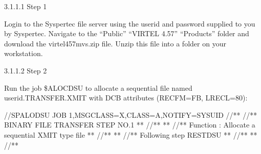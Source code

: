 \documentclass[letterpaper,10pt,english]{sphinxmanual}
\begin{document}
3.1.1.1 Step 1

Login to the Syspertec file server  using the userid and password supplied to you by Syspertec. Navigate to the “Public” \textendash{} “VIRTEL 4.57” \textendash{} “Products” folder and download the virtel457mvs.zip file. Unzip this file into a folder on your workstation.

3.1.1.2 Step 2

Run the job \$ALOCDSU to allocate a sequential file named userid.TRANSFER.XMIT with DCB attributes (RECFM=FB, LRECL=80):

\begin{sphinxVerbatim}[commandchars=\\\{\}]
//SPALODSU JOB 1,MSGCLASS=X,CLASS=A,NOTIFY=\PYGZam{}SYSUID
//*\PYGZhy{}\PYGZhy{}\PYGZhy{}\PYGZhy{}\PYGZhy{}\PYGZhy{}\PYGZhy{}\PYGZhy{}\PYGZhy{}\PYGZhy{}\PYGZhy{}\PYGZhy{}\PYGZhy{}\PYGZhy{}\PYGZhy{}\PYGZhy{}\PYGZhy{}\PYGZhy{}\PYGZhy{}\PYGZhy{}\PYGZhy{}\PYGZhy{}\PYGZhy{}\PYGZhy{}\PYGZhy{}\PYGZhy{}\PYGZhy{}\PYGZhy{}\PYGZhy{}\PYGZhy{}\PYGZhy{}\PYGZhy{}\PYGZhy{}\PYGZhy{}\PYGZhy{}\PYGZhy{}\PYGZhy{}\PYGZhy{}\PYGZhy{}\PYGZhy{}\PYGZhy{}\PYGZhy{}\PYGZhy{}\PYGZhy{}\PYGZhy{}\PYGZhy{}\PYGZhy{}\PYGZhy{}\PYGZhy{}\PYGZhy{}\PYGZhy{}\PYGZhy{}\PYGZhy{}\PYGZhy{}\PYGZhy{}\PYGZhy{}\PYGZhy{}\PYGZhy{}\PYGZhy{}\PYGZhy{}\PYGZhy{}\PYGZhy{}\PYGZhy{}\PYGZhy{}\PYGZhy{}\PYGZhy{}\PYGZhy{}*
//*\PYGZhy{}\PYGZhy{}* BINARY FILE TRANSFER \PYGZhy{} STEP NO.1                            *\PYGZhy{}\PYGZhy{}*
//*\PYGZhy{}\PYGZhy{}*                                                             *\PYGZhy{}\PYGZhy{}*
//*\PYGZhy{}\PYGZhy{}* Function : Allocate a sequential XMIT type file             *\PYGZhy{}\PYGZhy{}*
//*\PYGZhy{}\PYGZhy{}*                                                             *\PYGZhy{}\PYGZhy{}*
//*\PYGZhy{}\PYGZhy{}* Following step \PYGZdl{}RESTDSU                                     *\PYGZhy{}\PYGZhy{}*
//*\PYGZhy{}\PYGZhy{}*                                                             *\PYGZhy{}\PYGZhy{}*
//*\PYGZhy{}\PYGZhy{}\PYGZhy{}\PYGZhy{}\PYGZhy{}\PYGZhy{}\PYGZhy{}\PYGZhy{}\PYGZhy{}\PYGZhy{}\PYGZhy{}\PYGZhy{}\PYGZhy{}\PYGZhy{}\PYGZhy{}\PYGZhy{}\PYGZhy{}\PYGZhy{}\PYGZhy{}\PYGZhy{}\PYGZhy{}\PYGZhy{}\PYGZhy{}\PYGZhy{}\PYGZhy{}\PYGZhy{}\PYGZhy{}\PYGZhy{}\PYGZhy{}\PYGZhy{}\PYGZhy{}\PYGZhy{}\PYGZhy{}\PYGZhy{}\PYGZhy{}\PYGZhy{}\PYGZhy{}\PYGZhy{}\PYGZhy{}\PYGZhy{}\PYGZhy{}\PYGZhy{}\PYGZhy{}\PYGZhy{}\PYGZhy{}\PYGZhy{}\PYGZhy{}\PYGZhy{}\PYGZhy{}\PYGZhy{}\PYGZhy{}\PYGZhy{}\PYGZhy{}\PYGZhy{}\PYGZhy{}\PYGZhy{}\PYGZhy{}\PYGZhy{}\PYGZhy{}\PYGZhy{}\PYGZhy{}\PYGZhy{}\PYGZhy{}\PYGZhy{}\PYGZhy{}\PYGZhy{}\PYGZhy{}*

\end{sphinxVerbatim}
\end{document}
